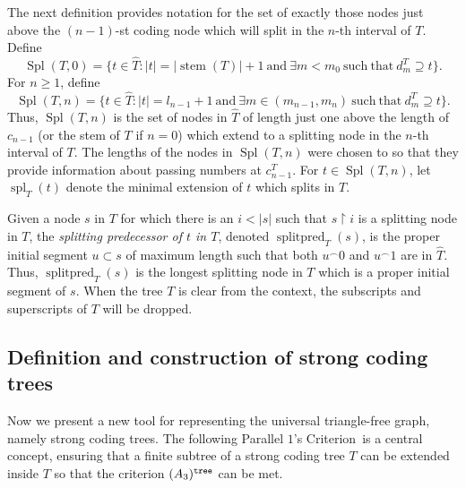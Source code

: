 \documentclass{amsart}
\theoremstyle{remark}
\theoremstyle{definition}
\theoremstyle{remark}
\newcommand{\contains}{\supseteq}
\DeclareMathOperator{\stem}{stem}
\DeclareMathOperator{\Spl}{Spl}
\DeclareMathOperator{\spl}{spl}
\DeclareMathOperator{\splitpred}{splitpred}
\newcommand{\re}{\restriction}
\newcommand{\POC}{Parallel $1$'s Criterion}
\begin{document}
The next definition  provides   notation for the set of  exactly those nodes just above the $(n-1)$-st coding node which will split  in the $n$-th interval of $T$.
Define
\begin{equation}
\Spl(T,0)=\{t\in \widehat{T}:
|t|=|\stem(T)|+1 \mathrm{\ and\ } \exists m<m_0
\mathrm{\ such\ that\ }d^T_m\contains t\}.
\end{equation}
For $n\ge 1$,
define
\begin{equation}
\Spl(T,n)=\{t\in \widehat{T}:
|t|=l_{n-1}+1\mathrm{\ and\ }
\exists
m\in(m_{n-1},m_n) \mathrm{\ such\ that\ } d^T_m\contains  t\}.
\end{equation}
Thus, $\Spl(T,n)$ is the set of nodes in $\widehat{T}$ of length
just one
 above the length of $c_{n-1}$ (or the stem of $T$ if $n=0$)
which extend to a splitting node  in the $n$-th interval of  $T$.
The lengths of the nodes in $\Spl(T,n)$ were chosen to so that they provide  information about passing numbers at $c_{n-1}^T$.
For  $t\in\Spl(T,n)$, let $\spl_T(t)$ denote the minimal extension of $t$ which splits in $T$.



Given a node $s$  in $T$ for which there is an $i< |s|$ such that $s\re i$ is a splitting node in $T$,
 the {\em splitting predecessor of $t$ in $T$}, denoted
$\splitpred_T(s)$,
is  the proper initial segment $u\subset s$ of maximum length such that both $u^{\frown}0$ and $u^{\frown}1$ are  in $\widehat{T}$.
Thus, $\splitpred_T(s)$ is the longest  splitting node in $T$ which is a   proper initial segment   of $s$.
When the tree  $T$ is clear from the context,  the  subscripts  and superscripts of  $T$ will be dropped.











\subsection{Definition and construction of strong coding trees}\label{defconsct}
Now we present a new tool for representing the universal triangle-free graph, namely strong coding trees.
The following \POC\   is a  central concept,
 ensuring that  a  finite subtree of a strong coding tree $T$ can be extended inside $T$ so that the criterion $(A_3)^{\tt tree}$ can be met.
\end{document}
